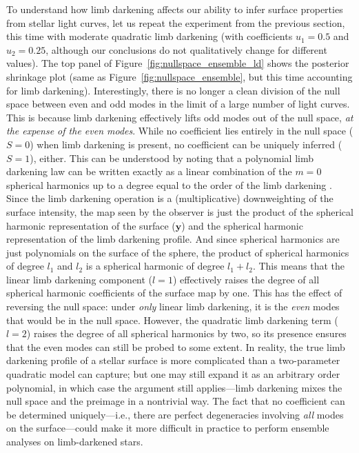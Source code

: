 \documentclass[modern]{aastex62}
\begin{document}
To understand how limb darkening affects our ability to infer
surface properties from stellar light curves,
let us repeat the experiment from the previous section,
this time with moderate quadratic limb darkening (with coefficients
$u_1 = 0.5$ and $u_2 = 0.25$, although our conclusions do not
qualitatively change for different values).
The top panel of Figure~\ref{fig:nullspace_ensemble_ld} shows the
posterior shrinkage plot (same as Figure~\ref{fig:nullspace_ensemble}, but
this time accounting for limb darkening). Interestingly, there is no longer a clean division of
the null space between even and odd modes in the limit of a large number
of light curves.
This is because limb darkening effectively lifts odd modes out of the null space, \emph{at the
    expense of the even modes}. While no coefficient lies entirely in the
null space ($S = 0$) when limb darkening is present, no coefficient
can be uniquely inferred ($S = 1$), either. This can be understood by noting that
a polynomial limb darkening law can be written
exactly as a linear combination of the $m=0$ spherical harmonics
up to a degree equal to the order of the limb darkening
\citep[in this case, $l = 2$;]{Luger2019,Agol2020}.
Since the limb darkening operation is a (multiplicative) downweighting of
the surface intensity, the map seen by the observer is just the product
of the spherical harmonic representation of the surface ($\mathbf{y}$)
and the spherical harmonic representation of the limb darkening profile.
And since spherical harmonics are just polynomials on the surface of the sphere,
the product of spherical harmonics of degree $l_1$ and $l_2$ is a spherical
harmonic of degree $l_1 + l_2$. This means that the linear limb darkening
component ($l = 1$) effectively raises the degree of all spherical harmonic
coefficients of the surface map by one. This has the effect of reversing
the null space: under \emph{only} linear limb darkening, it is the \emph{even}
modes that would be in the null space. However, the quadratic
limb darkening term ($l = 2$) raises the degree of all spherical harmonics by two,
so its presence ensures that the even modes can still be probed to some extent.
In reality, the true limb darkening profile of a stellar surface is more
complicated than a two-parameter quadratic model can capture; but one may still
expand it as an arbitrary order polynomial, in which case the argument still
applies---limb darkening mixes the null space and the preimage in a nontrivial
way.
%
The fact that no coefficient can be determined uniquely---i.e., there are
perfect degeneracies involving \emph{all} modes on the surface---could make it more
difficult in practice to perform ensemble analyses on limb-darkened stars.
\end{document}
